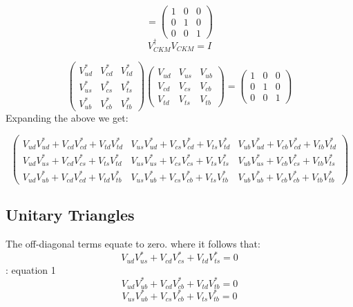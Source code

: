 \documentclass[12pt,a4paper]{article}
\begin{document}
\[ 
 =
 \left(
 \begin{array}{ccc}
  1 & 0 & 0 \\
  0 & 1 & 0 \\
  0 & 0 & 1
 \end{array}
 \right)
 \]
\[ V_{CKM}^\dagger V_{CKM} = I \]

 \[
 \left(
 \begin{array}{ccc}
  V_{ud}^* & V_{cd}^* & V_{td}^* \\
  V_{us}^* & V_{cs}^* & V_{ts}^* \\
  V_{ub}^* & V_{cb}^* & V_{tb}^*
 \end{array}
 \right)
 \left(
 \begin{array}{ccc}
  V_{ud} & V_{us} & V_{ub} \\
  V_{cd} & V_{cs} & V_{cb} \\
  V_{td} & V_{ts} & V_{tb}
 \end{array}
 \right)
 = 
  \left(
 \begin{array}{ccc}
  1 & 0 & 0 \\
  0 & 1 & 0 \\
  0 & 0 & 1
 \end{array}
 \right)
\]
Expanding the above we get:

\[
 \left(
 \begin{array}{ccc}
  V_{ud}V_{ud}^* +  V_{cd}V_{cd}^* + V_{td}V_{td}^* & V_{us}V_{ud}^* +  V_{cs}V_{cd}^* + V_{ts}V_{td}^* & V_{ub}V_{ud}^* +  V_{cb}V_{cd}^* + V_{tb}V_{td}^* \\
  
  V_{ud}V_{us}^* +  V_{cd}V_{cs}^* + V_{ts}V_{td}^* & V_{us}V_{us}^* +  V_{cs}V_{cs}^* + V_{ts}V_{ts}^* & V_{ub}V_{us}^* +  V_{cb}V_{cs}^* + V_{tb}V_{ts}^* \\
  
  V_{ud}V_{ub}^* +  V_{cd}V_{cd}^* + V_{td}V_{tb}^* & V_{us}V_{ub}^* +  V_{cs}V_{cb}^* + V_{ts}V_{tb}^* & V_{ub}V_{ub}^* +  V_{cb}V_{cb}^* + V_{tb}V_{tb}^*
  
 \end{array}
 \right)
\]


\subsection{Unitary Triangles}
The off-diagonal terms equate to zero. where it follows that:
%
\[ V_{ud}V_{us}^* + V_{cd}V_{cs}^*+V_{td}V_{ts}^*=0\] : equation 1 %
\[ V_{ud}V_{ub}^* + V_{cd}V_{cb}^*+V_{td}V_{tb}^*=0\]
\[ V_{us}V_{ub}^* + V_{cs}V_{cb}^*+V_{ts}V_{tb}^*=0\]
\end{document}
